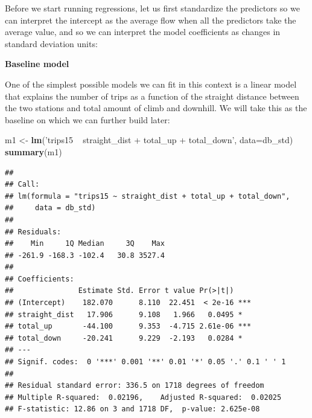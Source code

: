 \documentclass[]{book}
\newenvironment{Shaded}{\begin{snugshade}}{\end{snugshade}}
\newcommand{\KeywordTok}[1]{\textcolor[rgb]{0.13,0.29,0.53}{\textbf{#1}}}
\newcommand{\DataTypeTok}[1]{\textcolor[rgb]{0.13,0.29,0.53}{#1}}
\newcommand{\StringTok}[1]{\textcolor[rgb]{0.31,0.60,0.02}{#1}}
\newcommand{\CommentTok}[1]{\textcolor[rgb]{0.56,0.35,0.01}{\textit{#1}}}
\newcommand{\OperatorTok}[1]{\textcolor[rgb]{0.81,0.36,0.00}{\textbf{#1}}}
\newcommand{\NormalTok}[1]{#1}
\begin{document}
Before we start running regressions, let us first standardize the
predictors so we can interpret the intercept as the average flow when
all the predictors take the average value, and so we can interpret the
model coefficients as changes in standard deviation units:

\begin{Shaded}
\end{Shaded}

\textbf{Baseline model}

One of the simplest possible models we can fit in this context is a
linear model that explains the number of trips as a function of the
straight distance between the two stations and total amount of climb and
downhill. We will take this as the baseline on which we can further
build later:

\begin{Shaded}
\begin{Highlighting}[]
\NormalTok{m1 <-}\StringTok{ }\KeywordTok{lm}\NormalTok{(}\StringTok{'trips15 ~ straight_dist + total_up + total_down'}\NormalTok{, }\DataTypeTok{data=}\NormalTok{db_std)}
\KeywordTok{summary}\NormalTok{(m1)}
\end{Highlighting}
\end{Shaded}

\begin{verbatim}
## 
## Call:
## lm(formula = "trips15 ~ straight_dist + total_up + total_down", 
##     data = db_std)
## 
## Residuals:
##    Min     1Q Median     3Q    Max 
## -261.9 -168.3 -102.4   30.8 3527.4 
## 
## Coefficients:
##               Estimate Std. Error t value Pr(>|t|)    
## (Intercept)    182.070      8.110  22.451  < 2e-16 ***
## straight_dist   17.906      9.108   1.966   0.0495 *  
## total_up       -44.100      9.353  -4.715 2.61e-06 ***
## total_down     -20.241      9.229  -2.193   0.0284 *  
## ---
## Signif. codes:  0 '***' 0.001 '**' 0.01 '*' 0.05 '.' 0.1 ' ' 1
## 
## Residual standard error: 336.5 on 1718 degrees of freedom
## Multiple R-squared:  0.02196,    Adjusted R-squared:  0.02025 
## F-statistic: 12.86 on 3 and 1718 DF,  p-value: 2.625e-08
\end{verbatim}
\end{document}
